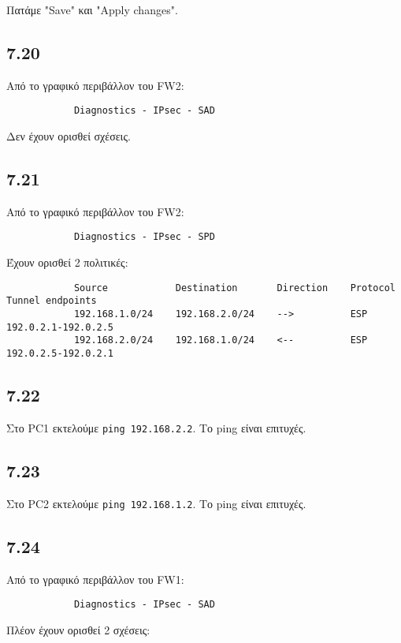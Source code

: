 \documentclass[a4paper, 12pt]{article}
\begin{document}
		Πατάμε "Save" και "Apply changes".
		
	\subsection*{7.20}
		Από το γραφικό περιβάλλον του FW2:
		
		\begin{verbatim}
			Diagnostics - IPsec - SAD
		\end{verbatim}

		Δεν έχουν ορισθεί σχέσεις.

	\subsection*{7.21}
		Από το γραφικό περιβάλλον του FW2:
		
		\begin{verbatim}
			Diagnostics - IPsec - SPD
		\end{verbatim}
		
		Έχουν ορισθεί 2 πολιτικές:
		
		\begin{verbatim}
			Source            Destination       Direction    Protocol    Tunnel endpoints
			192.168.1.0/24    192.168.2.0/24    -->          ESP         192.0.2.1-192.0.2.5
			192.168.2.0/24    192.168.1.0/24    <--          ESP         192.0.2.5-192.0.2.1
		\end{verbatim}
		
	\subsection*{7.22}
		Στο PC1 εκτελούμε \verb|ping 192.168.2.2|. Το ping είναι επιτυχές.

	\subsection*{7.23}
		Στο PC2 εκτελούμε \verb|ping 192.168.1.2|. Το ping είναι επιτυχές.

	\subsection*{7.24}
		Από το γραφικό περιβάλλον του FW1:
		
		\begin{verbatim}
			Diagnostics - IPsec - SAD
		\end{verbatim}
		
		Πλέον έχουν ορισθεί 2 σχέσεις:
		
\end{document}
